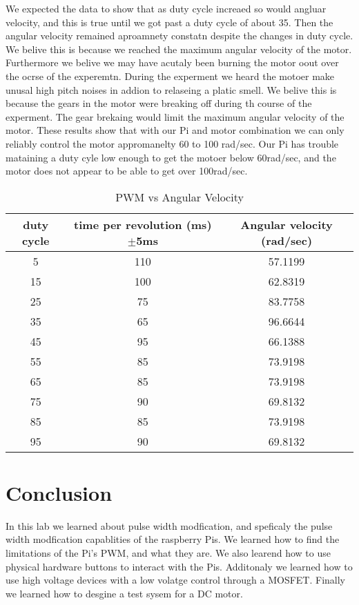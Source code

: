\documentclass[prl,12pt,notitlepage,aps,onecolumn,superscriptaddress]{revtex4-1}
\begin{document}
We expected the data to show that as duty cycle increaed so would angluar velocity, and this is true until we got past a duty cycle of about 35. Then the angular velocity remained aproamnety constatn despite the changes in duty cycle. We belive this is because we reached the maximum angular velocity of the motor. Furthermore we belive we may have acutaly been burning the motor oout over the ocrse of the experemtn. During the experment we heard the motoer make unusal high pitch noises in addion to relaseing a platic smell. We belive this is because the gears in the motor were breaking off during th course of the experment. The gear brekaing would limit the maximum angular velocity of the motor. These results show that with our Pi and motor combination we can only reliably control the motor appromanelty 60 to 100 rad/sec. Our Pi has trouble mataining a duty cyle low enough to get the motoer below 60rad/sec, and the motor does not appear to be able to get over 100rad/sec.

\begin{table}[h]
  \centering
  \caption{PWM vs Angular Velocity}
    \begin{tabular}{c|c|c}
    \toprule
    duty cycle & time per revolution (ms) $\pm$5ms & Angular velocity (rad/sec) \\
    \midrule
    5     & 110   & 57.1199 \\
    15    & 100   & 62.8319 \\
    25    & 75    & 83.7758 \\
    35    & 65    & 96.6644 \\
    45    & 95    & 66.1388 \\
    55    & 85    & 73.9198 \\
    65    & 85    & 73.9198 \\
    75    & 90    & 69.8132 \\
    85    & 85    & 73.9198 \\
    95    & 90    & 69.8132 \\
    \bottomrule
    \end{tabular}%
  \label{tab:addlabel}%
\end{table}%


\section{Conclusion}
In this lab we learned about pulse width modfication, and speficaly the pulse width modfication capablities of the raspberry Pis. We learned how to find the limitations of the Pi's PWM, and what they are. We also learend how to use physical hardware buttons to interact with the Pis. Additonaly we learned how to use high voltage devices with a low volatge control through a MOSFET. Finally we learned how to desgine a test sysem for a DC motor.


\end{document}
